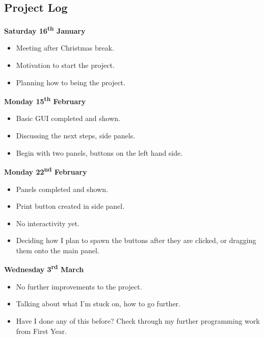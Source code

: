 \documentclass[a4paper, 12pt]{article}
\begin{document}
        \subsection{Project Log}
            \textbf{Saturday 16\textsuperscript{th} January}
                \begin{itemize}
                    \item Meeting after Christmas break.
                    \item Motivation to start the project.
                    \item Planning how to being the project. \\
                \end{itemize}
            \textbf{Monday 15\textsuperscript{th} February}
                \begin{itemize}
                    \item Basic GUI completed and shown.
                    \item Discussing the next steps, side panels.
                    \item Begin with two panels, buttons on the left hand side. \\
                \end{itemize}
            \textbf{Monday 22\textsuperscript{nd} February}
                \begin{itemize}
                    \item Panels completed and shown.
                    \item Print button created in side panel.
                    \item No interactivity yet.
                    \item Deciding how I plan to spawn the buttons after they are clicked,
                    or dragging them onto the main panel. \\
                \end{itemize}
            \textbf{Wednesday 3\textsuperscript{rd} March}
                \begin{itemize}
                    \item No further improvements to the project.
                    \item Talking about what I'm stuck on, how to go further.
                    \item Have I done any of this before? Check through my further programming
                    work from First Year. \\
                \end{itemize}
\end{document}
